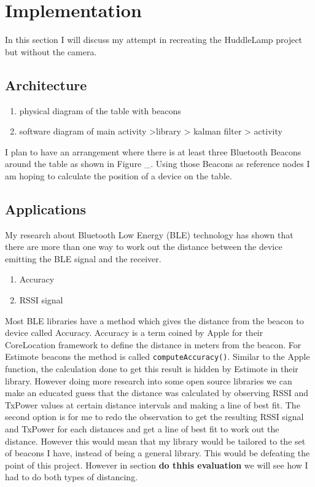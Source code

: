 \section{Implementation}

In this section I will discuss my attempt in recreating the HuddleLamp project but without the camera. 


\subsection{Architecture} \label{nocamer_architecture}
 \begin{enumerate}
 \item physical diagram of the table with beacons
 \item software diagram of main activity \-\->library \-\-> kalman filter \-\-> activity
 \end{enumerate}
 I plan to have an arrangement where there is at least three Bluetooth Beacons around the table as shown in Figure \_. Using those Beacons as reference nodes I am hoping to calculate the position of a device on the table.

\subsection{Applications}
My research about Bluetooth Low Energy (BLE) technology has shown that there are more than one way to work out the distance between the device emitting the BLE signal and the receiver. 
\begin{enumerate}
\item Accuracy
\item RSSI signal
\end{enumerate}
Most BLE libraries have a method which gives the distance from the beacon to device called Accuracy. Accuracy is a term coined by Apple for their CoreLocation framework to define the distance in meters from the beacon. For Estimote beacons the method is called  \lstinline|computeAccuracy()|. Similar to the Apple function, the calculation done to get this result is hidden by Estimote in their library. However doing more research into some open source libraries \cite{radius-ranging, android_ibeacon_alt} we can make an educated guess that the distance was calculated by observing RSSI and TxPower values at certain distance intervals and making a line of best fit.
The second option is for me to redo the observation to get the resulting RSSI signal and TxPower for each distances and get a line of best fit to work out the distance. However this would mean that my library would be tailored to the set of beacons I have, instead of being a general library. This would be defeating the point of this project. However in section \textbf{do thhis evaluation} we will see how I had to do both types of distancing.


